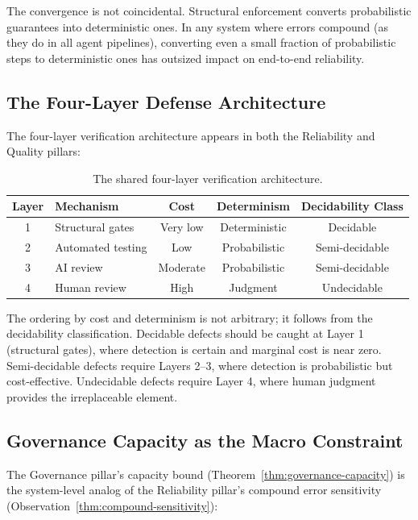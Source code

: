 \documentclass[11pt, a4paper]{googledeepmind}
\begin{document}
The convergence is not coincidental. Structural enforcement converts probabilistic guarantees into deterministic ones. In any system where errors compound (as they do in all agent pipelines), converting even a small fraction of probabilistic steps to deterministic ones has outsized impact on end-to-end reliability.

\subsection{The Four-Layer Defense Architecture}

The four-layer verification architecture appears in both the Reliability and Quality pillars:

\begin{table}[h]
\centering
\caption{The shared four-layer verification architecture.}
\label{tab:four-layer}
\begin{tabular}{clccc}
\toprule
\textbf{Layer} & \textbf{Mechanism} & \textbf{Cost} & \textbf{Determinism} & \textbf{Decidability Class} \\
\midrule
1 & Structural gates & Very low & Deterministic & Decidable \\
2 & Automated testing & Low & Probabilistic & Semi-decidable \\
3 & AI review & Moderate & Probabilistic & Semi-decidable \\
4 & Human review & High & Judgment & Undecidable \\
\bottomrule
\end{tabular}
\end{table}

The ordering by cost and determinism is not arbitrary; it follows from the decidability classification. Decidable defects should be caught at Layer 1 (structural gates), where detection is certain and marginal cost is near zero. Semi-decidable defects require Layers 2--3, where detection is probabilistic but cost-effective. Undecidable defects require Layer 4, where human judgment provides the irreplaceable element.

\subsection{Governance Capacity as the Macro Constraint}

The Governance pillar's capacity bound (Theorem~\ref{thm:governance-capacity}) is the system-level analog of the Reliability pillar's compound error sensitivity (Observation~\ref{thm:compound-sensitivity}):
\end{document}
